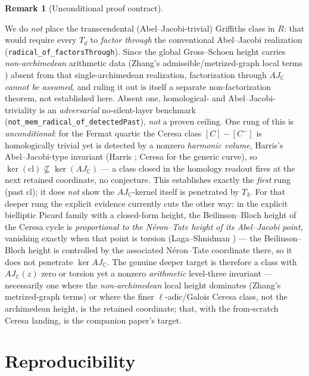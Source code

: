\documentclass[11pt]{article}
\newcommand{\inst}[1]{%
\samnote{INSTRUCTION: #1}%
}
\theoremstyle{definition}
\newtheorem{remark}[theorem]{Remark}
\begin{document}
\begin{remark}[Unconditional proof contract]
\begin{enumerate}
We do \emph{not} place the transcendental (Abel--Jacobi-trivial) Griffiths class in $R$: that
would require every $T_d$ to \emph{factor through} the conventional Abel--Jacobi realization
(\texttt{radical\_of\_factorsThrough}). Since the global Gross--Schoen height carries
\emph{non-archimedean} arithmetic data (Zhang's admissible/metrized-graph local terms \cite{ZhangGS})
absent from that single-archimedean realization, factorization through $AJ_{\mathbb C}$ \emph{cannot be
assumed}, and ruling it out is itself a separate non-factorization theorem, not established here.
Absent one, homological- and Abel--Jacobi-triviality is an \emph{adversarial} no-silent-layer
benchmark (\texttt{not\_mem\_radical\_of\_detectedPast}), \emph{not} a proven ceiling. One rung of this
is \emph{unconditional}: for the Fermat quartic the Ceresa class $[C]-[C^-]$ is homologically trivial
yet is detected by a nonzero \emph{harmonic volume}, Harris's Abel--Jacobi-type invariant (Harris
\cite{Harris}; Ceresa \cite{Ceresa} for the generic curve), so
$\ker(\mathrm{cl})\not\subseteq\ker(AJ_{\mathbb C})$ --- a class closed in the homology readout fires at
the next retained coordinate, no conjecture. This establishes exactly the
\emph{first} rung (past $\mathrm{cl}$); it does \emph{not} show the $AJ_{\mathbb C}$-kernel itself is
penetrated by $T_3$. For that deeper rung the explicit evidence currently cuts the other way: in the
explicit bielliptic Picard family with a closed-form height, the Beilinson--Bloch height of the
Ceresa cycle is \emph{proportional to the N\'eron--Tate height of its Abel--Jacobi point}, vanishing
exactly when that point is torsion (Laga--Shnidman \cite{LagaShnidman}) --- the Beilinson--Bloch height is
controlled by the associated N\'eron--Tate coordinate there, so it does not penetrate $\ker AJ_{\mathbb C}$. The genuine deeper target
is therefore a class with $AJ_{\mathbb C}(z)$ zero or torsion yet a nonzero \emph{arithmetic}
level-three invariant --- necessarily one where the \emph{non-archimedean} local height dominates
(Zhang's metrized-graph terms) or where the finer $\ell$-adic/Galois Ceresa class, not the archimedean
height, is the retained coordinate; that, with the from-scratch Ceresa landing, is the companion
paper's target. \inst{move to hodge part}



\appendix
\section{Reproducibility}\label{app:repro}


\end{enumerate}
\end{remark}
\end{document}
